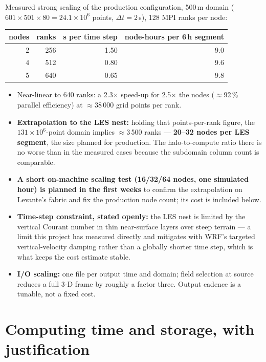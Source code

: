 \documentclass[10pt,a4paper]{article}
\begin{document}
Measured strong scaling of the production configuration, 500\,m domain
($601\times501\times80 = 24.1\times10^6$ points, $\Delta t = 2$\,s), 128 MPI
ranks per node:

\begin{center}
\begin{tabular}{@{}rrrr@{}}
\toprule
nodes & ranks & s per time step & node-hours per 6\,h segment \\
\midrule
2 & 256 & 1.50 & 9.0 \\
4 & 512 & 0.80 & 9.6 \\
5 & 640 & 0.65 & 9.8 \\
\bottomrule
\end{tabular}
\end{center}

\begin{itemize}
\item Near-linear to 640 ranks: a 2.3$\times$ speed-up for 2.5$\times$ the
  nodes ($\approx$92\,\% parallel efficiency) at $\approx$38\,000 grid points
  per rank.
\item \textbf{Extrapolation to the LES nest:} holding that points-per-rank
  figure, the $131\times10^6$-point domain implies $\approx$3\,500 ranks ---
  \textbf{20--32 nodes per LES segment}, the size planned for production. The
  halo-to-compute ratio there is no worse than in the measured cases because the
  subdomain column count is comparable.
\item \textbf{A short on-machine scaling test (16/32/64 nodes, one simulated
  hour) is planned in the first weeks} to confirm the extrapolation on Levante's
  fabric and fix the production node count; its cost is included below.
\item \textbf{Time-step constraint, stated openly:} the LES nest is limited by
  the vertical Courant number in thin near-surface layers over steep terrain ---
  a limit this project has measured directly and mitigates with WRF's targeted
  vertical-velocity damping rather than a globally shorter time step, which is
  what keeps the cost estimate stable.
\item \textbf{I/O scaling:} one file per output time and domain; field selection
  at source reduces a full 3-D frame by roughly a factor three. Output cadence is
  a tunable, not a fixed cost.
\end{itemize}

\section*{Computing time and storage, with justification}
\end{document}
